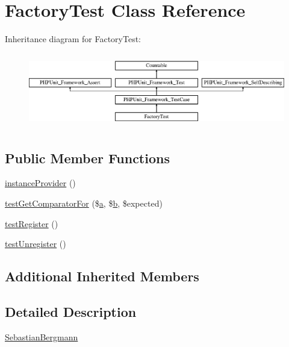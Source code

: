 \hypertarget{class_sebastian_bergmann_1_1_comparator_1_1_factory_test}{}\section{Factory\+Test Class Reference}
\label{class_sebastian_bergmann_1_1_comparator_1_1_factory_test}
Inheritance diagram for Factory\+Test\+:\begin{figure}[H]
\begin{center}
\leavevmode
\includegraphics[height=3.303835cm]{class_sebastian_bergmann_1_1_comparator_1_1_factory_test}
\end{center}
\end{figure}
\subsection*{Public Member Functions}
\begin{DoxyCompactItemize}
\item 
\mbox{\hyperlink{class_sebastian_bergmann_1_1_comparator_1_1_factory_test_a7ca2551bee7dea0b94741b10d8a030b3}{instance\+Provider}} ()
\item 
\mbox{\hyperlink{class_sebastian_bergmann_1_1_comparator_1_1_factory_test_a571ba5632a9b6c718106fbffcc008b5e}{test\+Get\+Comparator\+For}} (\$\mbox{\hyperlink{interfacea}{a}}, \$\mbox{\hyperlink{interfaceb}{b}}, \$expected)
\item 
\mbox{\hyperlink{class_sebastian_bergmann_1_1_comparator_1_1_factory_test_a21ba109cac25766104644b11982265e1}{test\+Register}} ()
\item 
\mbox{\hyperlink{class_sebastian_bergmann_1_1_comparator_1_1_factory_test_a292071d9a8476ecfcdb82ff16400c5b7}{test\+Unregister}} ()
\end{DoxyCompactItemize}
\subsection*{Additional Inherited Members}


\subsection{Detailed Description}
\mbox{\hyperlink{namespace_sebastian_bergmann}{Sebastian\+Bergmann}} 

